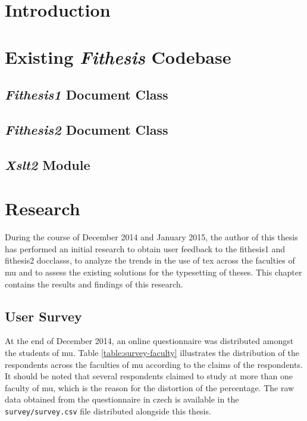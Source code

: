   \begin{ThesisAbstract}
    \blindtext
  \end{ThesisAbstract}

  \begin{ThesisKeyWords}
    \blindtext
  \end{ThesisKeyWords}

  \tableofcontents
  \listoftables
  \listoffigures

  \MainMatter
  \chapter{Introduction}
    \blindtext

  \chapter{Existing \emph{Fithesis} Codebase}
    \blindtext
    
    \section{\emph{Fithesis1} Document Class}
    \blindtext

    \section{\emph{Fithesis2} Document Class}
    \blindtext

    \section{\emph{Xslt2} Module}
    \blindtext

  \chapter{Research}
  During the course of December 2014 and January 2015, the author of this thesis has performed an initial research to obtain user feedback to the fithesis1 and fithesis2 \glspl{docclass}, to analyze the trends in the use of \gls{tex} across the faculties of \gls{mu} and to assess the existing solutions for the typesetting of theses. This chapter contains the results and findings of this research.

    \section{User Survey}
    At the end of December 2014, an online questionnaire was distributed amongst the students of \gls{mu}. Table \ref{table:survey-faculty} illustrates the distribution of the respondents across the faculties of \gls{mu} according to the claims of the respondents. It should be noted that several respondents claimed to study at more than one faculty of \gls{mu}, which is the reason for the distortion of the percentage. The raw data obtained from the questionnaire in czech is available in the \texttt{survey/survey.csv} file distributed alongside this thesis.

